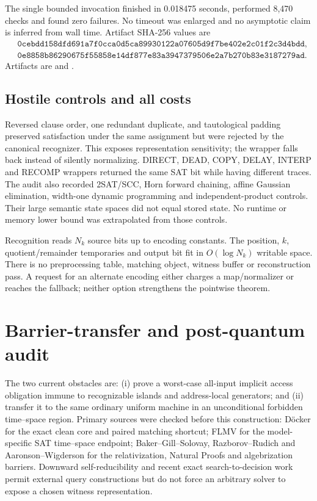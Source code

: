 \documentclass[11pt]{article}
\begin{document}
The single bounded invocation finished in 0.018475 seconds, performed 8,470
checks and found zero failures.  No timeout was enlarged and no asymptotic
claim is inferred from wall time.  Artifact SHA-256 values are
\begin{align*}
 &\texttt{0cebdd158dfd691a7f0cca0d5ca89930122a07605d9f7be402e2c01f2c3d4bdd},\\
 &\texttt{0e8858b86290675f55858e14df877e83a3947379506e2a7b270b83e3187279ad}.
\end{align*}
Artifacts are
and
.

\subsection*{Hostile controls and all costs}
Reversed clause order, one redundant duplicate, and tautological padding
preserved satisfaction under the same assignment but were rejected by the
canonical recognizer.  This exposes representation sensitivity; the wrapper
falls back instead of silently normalizing.  DIRECT, DEAD, COPY, DELAY,
INTERP and RECOMP wrappers returned the same SAT bit while having different
traces.  The audit also recorded 2SAT/SCC, Horn forward chaining, affine
Gaussian elimination, width-one dynamic programming and independent-product
controls.  Their large semantic state spaces did not equal stored state.
No runtime or memory lower bound was extrapolated from those controls.

Recognition reads $N_k$ source bits up to encoding constants.  The position,
$k$, quotient/remainder temporaries and output bit fit in $O(\log N_k)$
writable space.  There is no preprocessing table, matching object, witness
buffer or reconstruction pass.  A request for an alternate encoding either
charges a map/normalizer or reaches the fallback; neither option strengthens
the pointwise theorem.

\section{Barrier-transfer and post-quantum audit}
The two current obstacles are: (i) prove a worst-case all-input implicit
access obligation immune to recognizable islands and address-local
generators; and (ii) transfer it to the same ordinary uniform machine in an
unconditional forbidden time--space region.  Primary sources were checked
before this construction: D\"ocker for the exact clean core and paired
matching shortcut; FLMV for the model-specific SAT time--space endpoint;
Baker--Gill--Solovay, Razborov--Rudich and Aaronson--Wigderson for the
relativization, Natural Proofs and algebrization barriers.  Downward
self-reducibility and recent exact search-to-decision work permit external
query constructions but do not force an arbitrary solver to expose a chosen
witness representation.
\end{document}
